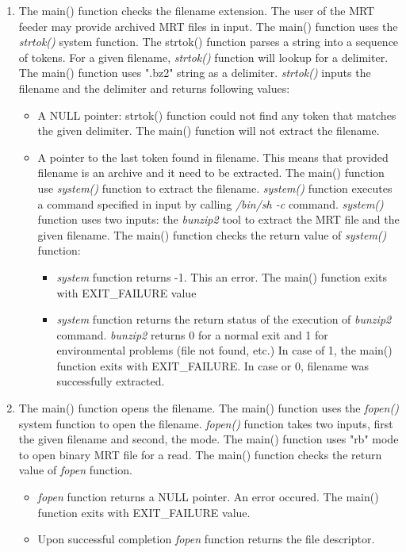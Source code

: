 \begin{enumerate}
\begin{enumerate}
  \item{The  main() function checks the filename extension. The user of the MRT feeder may provide archived MRT files in input. The  main() function uses the \emph{strtok()} system function. The  strtok()  function parses a string into a sequence of tokens. For a given filename, \emph{strtok()} function will lookup for a delimiter. The  main() function uses ".bz2" string as a delimiter. \emph{strtok()} inputs the filename and the delimiter and returns following values:    }
  \begin{itemize}
  \item{A NULL pointer: strtok() function could not find any token that matches the given delimiter. The  main() function will not extract the filename.}
  \item{A pointer to the last token found in filename. This means that provided filename is an archive and it need to be extracted. The main() function use \emph{system()} function to extract the filename. \emph{system()} function executes  a  command  specified  in input by calling \emph{/bin/sh -c} command. \emph{system()} function uses two inputs: the \emph{bunzip2} tool to extract the MRT file and the given filename.  The  main() function checks the return value of  \emph{system()}  function:}
  \begin{itemize}
  \item{\emph{system} function returns -1. This an error. The  main() function exits with EXIT\_FAILURE value}
   \item{\emph{system} function returns the return status of the execution of \emph{bunzip2} command. \emph{bunzip2} returns 0 for a normal exit and 1 for  environmental problems (file not found, etc.)  In case of 1,  the  main() function exits with EXIT\_FAILURE. In case or 0, filename was successfully extracted.}
  \end{itemize}  
  
  \end{itemize}

  \item{The  main() function opens the filename. The  main() function uses the \emph{fopen()} system function to open the filename. \emph{fopen()} function takes two inputs, first the given filename and second, the mode. The  main() function uses "rb" mode to open binary MRT file for a read. The  main() function checks the return value of \emph{fopen} function. }
  \begin{itemize}
  \item{\emph{fopen} function returns a NULL pointer. An error occured. The  main() function exits with EXIT\_FAILURE value.}
  \item{Upon successful completion \emph{fopen} function returns  the file descriptor. }
  \end{itemize}
  

\end{enumerate}
\end{enumerate}
